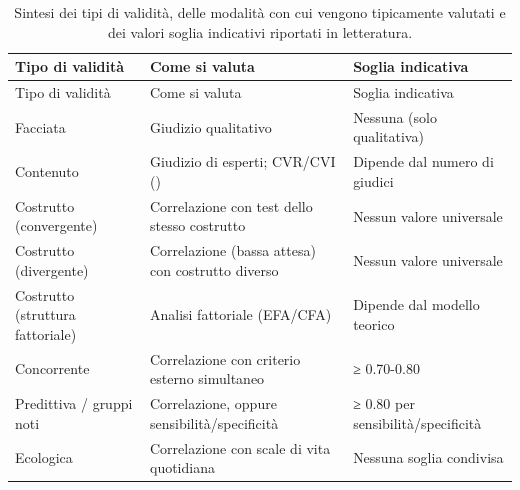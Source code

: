 \documentclass[
  italian,
  letterpaper,
  paper=6in:9in,
  pagesize=pdftex,
  headinclude=on,
  footinclude=on,
  11pt]{scrbook}
\begin{document}
\begin{longtable}[]{@{}
  >{\raggedright\arraybackslash}p{}
  >{\raggedright\arraybackslash}p{}
  >{\raggedright\arraybackslash}p{}@{}}
\caption{Sintesi dei tipi di validità, delle modalità con cui vengono
tipicamente valutati e dei valori soglia indicativi riportati in
letteratura.}\label{tbl-validita}\tabularnewline
\toprule\noalign{}
\begin{minipage}[b]{\linewidth}\raggedright
Tipo di validità
\end{minipage} & \begin{minipage}[b]{\linewidth}\raggedright
Come si valuta
\end{minipage} & \begin{minipage}[b]{\linewidth}\raggedright
Soglia indicativa
\end{minipage} \\
\midrule\noalign{}
\endfirsthead
\toprule\noalign{}
\begin{minipage}[b]{\linewidth}\raggedright
Tipo di validità
\end{minipage} & \begin{minipage}[b]{\linewidth}\raggedright
Come si valuta
\end{minipage} & \begin{minipage}[b]{\linewidth}\raggedright
Soglia indicativa
\end{minipage} \\
\midrule\noalign{}
\endhead
\bottomrule\noalign{}
\endlastfoot
Facciata & Giudizio qualitativo & Nessuna (solo qualitativa) \\
Contenuto & Giudizio di esperti; CVR/CVI (\cite{lawshe1975quantitative})
& Dipende dal numero di giudici \\
Costrutto (convergente) & Correlazione con test dello stesso costrutto &
Nessun valore universale \\
Costrutto (divergente) & Correlazione (bassa attesa) con costrutto
diverso & Nessun valore universale \\
Costrutto (struttura fattoriale) & Analisi fattoriale (EFA/CFA) &
Dipende dal modello teorico \\
Concorrente & Correlazione con criterio esterno simultaneo & ≥
0.70-0.80 \\
Predittiva / gruppi noti & Correlazione, oppure sensibilità/specificità
& ≥ 0.80 per sensibilità/specificità \\
Ecologica & Correlazione con scale di vita quotidiana & Nessuna soglia
condivisa \\
\end{longtable}
\end{document}
